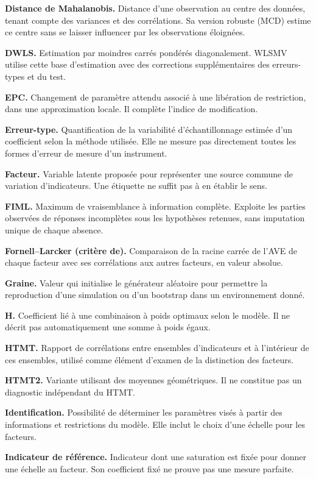 \documentclass[
  french,
  11pt,
  a4paper,
  DIV=11,
  numbers=noendperiod]{scrreprt}
\begin{document}
\textbf{Distance de Mahalanobis.} Distance d'une observation au centre
des données, tenant compte des variances et des corrélations. Sa version
robuste (MCD) estime ce centre sans se laisser influencer par les
observations éloignées.

\textbf{DWLS.} Estimation par moindres carrés pondérés diagonalement.
WLSMV utilise cette base d'estimation avec des corrections
supplémentaires des erreurs-types et du test.

\textbf{EPC.} Changement de paramètre attendu associé à une libération
de restriction, dans une approximation locale. Il complète l'indice de
modification.

\textbf{Erreur-type.} Quantification de la variabilité d'échantillonnage
estimée d'un coefficient selon la méthode utilisée. Elle ne mesure pas
directement toutes les formes d'erreur de mesure d'un instrument.

\textbf{Facteur.} Variable latente proposée pour représenter une source
commune de variation d'indicateurs. Une étiquette ne suffit pas à en
établir le sens.

\textbf{FIML.} Maximum de vraisemblance à information complète. Exploite
les parties observées de réponses incomplètes sous les hypothèses
retenues, sans imputation unique de chaque absence.

\textbf{Fornell--Larcker (critère de).} Comparaison de la racine carrée
de l'AVE de chaque facteur avec ses corrélations aux autres facteurs, en
valeur absolue.

\textbf{Graine.} Valeur qui initialise le générateur aléatoire pour
permettre la reproduction d'une simulation ou d'un bootstrap dans un
environnement donné.

\textbf{H.} Coefficient lié à une combinaison à poids optimaux selon le
modèle. Il ne décrit pas automatiquement une somme à poids égaux.

\textbf{HTMT.} Rapport de corrélations entre ensembles d'indicateurs et
à l'intérieur de ces ensembles, utilisé comme élément d'examen de la
distinction des facteurs.

\textbf{HTMT2.} Variante utilisant des moyennes géométriques. Il ne
constitue pas un diagnostic indépendant du HTMT.

\textbf{Identification.} Possibilité de déterminer les paramètres visés
à partir des informations et restrictions du modèle. Elle inclut le
choix d'une échelle pour les facteurs.

\textbf{Indicateur de référence.} Indicateur dont une saturation est
fixée pour donner une échelle au facteur. Son coefficient fixé ne prouve
pas une mesure parfaite.
\end{document}
